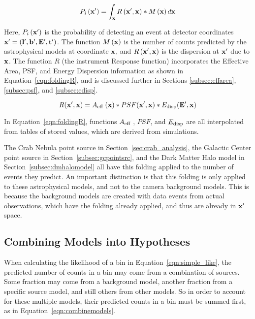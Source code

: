   \begin{equation}\label{eqn:folding}
    P_i \left( \mathbf{x'} \right ) = \int_{\mathbf{x }} R \left ( \mathbf{x'}, \mathbf{x } \right ) * M \left ( \mathbf{x } \right ) d\mathbf{x }
  \end{equation}
  
  Here, $P_i \left( \mathbf{x'} \right )$ is the probability of detecting an event at detector coordinates $\mathbf{x'} = \left ( \mathbf{l'}, \mathbf{b'}, \mathbf{E'}, \mathbf{t'} \right )$.
  The function $M\left ( \mathbf{x } \right )$ is the number of counts predicted by the astrophysical models at coordinate $\mathbf{x }$, and $R \left ( \mathbf{x'}, \mathbf{x } \right )$ is the dispersion at $\mathbf{x'}$ due to $\mathbf{x }$.
  The function $R$ (the instrument Response function) incorporates the Effective Area, PSF, and Energy Dispersion information as shown in Equation~\ref{eqn:foldingR}, and is discussed further in Sections \ref{subsec:effarea}, \ref{subsec:psf}, and \ref{subsec:edisp}.
  
  \begin{equation}\label{eqn:foldingR}
    R(\mathbf{x'},\mathbf{x }) = A_\textrm{eff }(\mathbf{x }) * PSF(\mathbf{x'},\mathbf{x }) * E_\textrm{disp}(\mathbf{E'},\mathbf{x })
  \end{equation}
  
  In Equation~\ref{eqn:foldingR}, functions $A_\textrm{eff }$, $PSF$, and $E_\textrm{disp}$ are all interpolated from tables of stored values, which are derived from simulations.

  The Crab Nebula point source in Section~\ref{sec:crab_analysis}, the Galactic Center point source in Section~\ref{subsec:gcpointsrc}, and the Dark Matter Halo model in Section~\ref{subsec:dmhalomodel} all have this folding applied to the number of events they predict.
  An important distinction is that this folding is only applied to these astrophysical models, and not to the camera background models.
  This is because the background models are created with data events from actual observations, which have the folding already applied, and thus are already in $\mathbf{x'}$ space.
  
  \subsection{Combining Models into Hypotheses}\label{subsec:hypotheses}
  
  When calculating the likelihood of a bin in Equation~\ref{eqn:simple_like}, the predicted number of counts in a bin may come from a combination of sources.
  Some fraction may come from a background model, another fraction from a specific source model, and still others from other models.
  So in order to account for these multiple models, their predicted counts in a bin must be summed first, as in Equation~\ref{eqn:combinemodels}.
  
